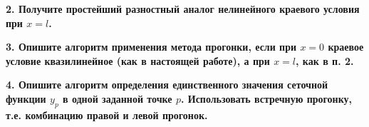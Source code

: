 \documentclass[a4paper,oneside,12pt]{extreport}
\begin{document}
\textbf{2. Получите  простейший разностный аналог нелинейного краевого условия при $x = l$.}\\

\begin{figure}[ht!]
\end{figure}


\textbf{3. Опишите алгоритм применения метода прогонки, если при $x = 0$ краевое условие квазилинейное (как в настоящей работе), а при $x = l$, как в п. 2.}\\

\begin{figure}[ht!]
\end{figure}

\textbf{4. Опишите алгоритм определения единственного значения сеточной функции $y_p$ в одной заданной точке $p$. Использовать встречную прогонку, т.е. комбинацию правой и левой прогонок.}\\

\begin{figure}[ht!]
\end{figure}
\end{document}
